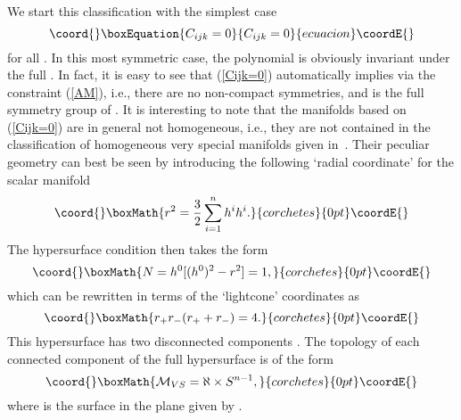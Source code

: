 \documentclass[a4paper,11pt]{article}
\providecommand{\M}{\ensuremath{\mathcal{M}}}
\begin{document}
We start this classification with the simplest case
\begin{equation}\coord{}\boxEquation{\label{Cijk=0}
C_{ijk}=0
}{C_{ijk}=0
}{ecuacion}\coordE{}\end{equation}
for all \coordHE{}. In this most symmetric case, the
polynomial \coordHE{} is obviously invariant under the full \coordHE{}. In fact,
it is easy to see that (\ref{Cijk=0}) automatically implies
\coordHE{} via the constraint (\ref{AM}), i.e.,
there are no non-compact symmetries, and \coordHE{} is the full symmetry
group of \coordHE{}. It is interesting to note that the manifolds based on
(\ref{Cijk=0}) are in general not homogeneous, i.e., they are not
contained in the classification of homogeneous very special manifolds
given in~\cite{dWvP2}. Their peculiar geometry can best be seen by
introducing the following `radial coordinate' for the scalar manifold 
\[\coord{}\boxMath{ r^2 = \frac{3}{2} \sum_{i=1}^{n} h^ih^i. }{corchetes}{0pt}\coordE{}\] 
The hypersurface condition then takes
the form 
\[\coord{}\boxMath{ N= h^0 [(h^0)^2 -r^2]=1, }{corchetes}{0pt}\coordE{}\] 
which can be rewritten in terms of the
`lightcone' coordinates \coordHE{} as 
\[\coord{}\boxMath{ r_+ r_- (r_+ + r_- )=4. }{corchetes}{0pt}\coordE{}\] 
This hypersurface has two disconnected components . The
topology of each connected component of the full hypersurface is of the
form 
\[\coord{}\boxMath{ \M_{VS}= \aleph \times S^{n-1}, }{corchetes}{0pt}\coordE{}\] 
where \myHighlight{$\aleph$}\coordHE{} is the surface in the \coordHE{} plane given by \coordHE{}. 
\end{document}
